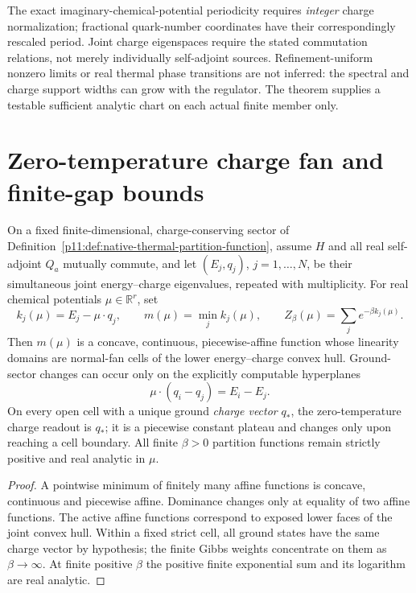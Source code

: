 \documentclass[12pt,a4paper]{article}
\begin{document}
\begin{remark}
The exact imaginary-chemical-potential periodicity requires
\emph{integer} charge normalization; fractional quark-number
coordinates have their correspondingly rescaled period.  Joint
charge eigenspaces require the stated commutation relations, not merely
individually self-adjoint sources.  Refinement-uniform nonzero limits
or real thermal phase transitions are not inferred: the spectral and
charge support widths can grow with the regulator.  The theorem
supplies a testable sufficient analytic chart on each actual finite
member only.
\end{remark}

\section{Zero-temperature charge fan and finite-gap bounds}
\label{p11:sec:cc14-charge-fan}
\begin{theorem}
\label{p11:thm:cc14-charge-fan}
On a fixed finite-dimensional, charge-conserving sector of
Definition~\ref{p11:def:native-thermal-partition-function}, assume
$H$ and all real self-adjoint $Q_a$ mutually commute, and let
$(E_j,q_j)$, $j=1,\ldots,N$, be their simultaneous joint
energy--charge eigenvalues, repeated with multiplicity.  For real
chemical potentials $\mu\in\mathbb R^r$, set
\[
 k_j(\mu)=E_j-\mu\cdot q_j,\qquad
 m(\mu)=\min_j k_j(\mu),\qquad
 Z_\beta(\mu)=\sum_j e^{-\beta k_j(\mu)}.
\]
Then $m(\mu)$ is a concave, continuous, piecewise-affine function
whose linearity domains are normal-fan cells of the lower
energy--charge convex hull.  Ground-sector changes can occur only
on the explicitly computable hyperplanes
\[
 \boxed{\mu\cdot(q_i-q_j)=E_i-E_j.}
\]
On every open cell with a unique ground \emph{charge vector}
$q_*$, the zero-temperature charge readout is $q_*$; it is a
piecewise constant plateau and changes only upon reaching a
cell boundary.  All finite $\beta>0$ partition functions remain
strictly positive and real analytic in $\mu$.
\end{theorem}
\begin{proof}
A pointwise minimum of finitely many affine functions is concave,
continuous and piecewise affine.  Dominance changes only at equality
of two affine functions.  The active affine functions correspond to
exposed lower faces of the joint convex hull.  Within a fixed
strict cell, all ground states have the same charge vector by
hypothesis; the finite Gibbs weights concentrate on them as
$\beta\to\infty$.  At finite positive $\beta$ the positive finite
exponential sum and its logarithm are real analytic.
\end{proof}
\end{document}
